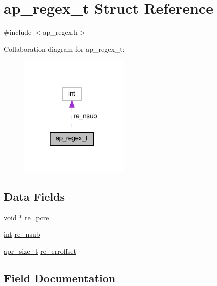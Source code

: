 \hypertarget{structap__regex__t}{}\section{ap\+\_\+regex\+\_\+t Struct Reference}
\label{structap__regex__t}


{\ttfamily \#include $<$ap\+\_\+regex.\+h$>$}



Collaboration diagram for ap\+\_\+regex\+\_\+t\+:
\nopagebreak
\begin{figure}[H]
\begin{center}
\leavevmode
\includegraphics[width=151pt]{structap__regex__t__coll__graph}
\end{center}
\end{figure}
\subsection*{Data Fields}
\begin{DoxyCompactItemize}
\item 
\hyperlink{group__MOD__ISAPI_gacd6cdbf73df3d9eed42fa493d9b621a6}{void} $\ast$ \hyperlink{structap__regex__t_aed475699de716bc65eed600817604d4e}{re\+\_\+pcre}
\item 
\hyperlink{pcre_8txt_a42dfa4ff673c82d8efe7144098fbc198}{int} \hyperlink{structap__regex__t_a85fab6fecaa820ff491ff80ae141e7ee}{re\+\_\+nsub}
\item 
\hyperlink{group__apr__platform_gaaa72b2253f6f3032cefea5712a27540e}{apr\+\_\+size\+\_\+t} \hyperlink{structap__regex__t_a253ebead3ef72994a5229ef289c20115}{re\+\_\+erroffset}
\end{DoxyCompactItemize}


\subsection{Field Documentation}

